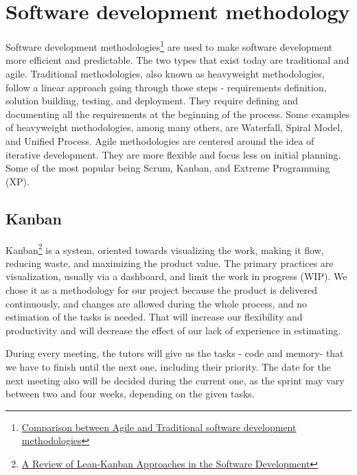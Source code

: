 \chapter{Software development methodology}
\label{Software development methodology}

Software development methodologies\footnote{\href{https://www.researchgate.net/publication/278300889_Comparison_between_Agile_and_Traditional_software_development_methodologies}{Comparison between Agile and Traditional software development methodologies}} are used to make software development more efficient and predictable. The two types that exist today are traditional and agile. 
Traditional methodologies, also known as heavyweight methodologies, follow a linear approach going through those steps - requirements definition, solution building, testing, and deployment. They require defining and documenting all the requirements at the beginning of the process. Some examples of heavyweight methodologies, among many others, are Waterfall, Spiral Model, and Unified Process.
Agile methodologies are centered around the idea of iterative development. They are more flexible and focus less on initial planning. Some of the most popular being Scrum, Kanban, and Extreme Programming (XP).

\section{Kanban}

Kanban\footnote{\href{https://www.wseas.org/multimedia/journals/information/2013/5709-110.pdf}{A Review of Lean-Kanban Approaches in the Software Development}} is a system, oriented towards visualizing the work, making it flow, reducing waste, and maximizing the product value. The primary practices are visualization, usually via a dashboard, and limit the work in progress (WIP). We chose it as a methodology for our project because the product is delivered continuously, and changes are allowed during the whole process, and no estimation of the tasks is needed. That will increase our flexibility and productivity and will decrease the effect of our lack of experience in estimating.

During every meeting, the tutors will give us the tasks - code and memory- that we have to finish until the next one, including their priority. The date for the next meeting also will be decided during the current one, as the sprint may vary between two and four weeks, depending on the given tasks.

